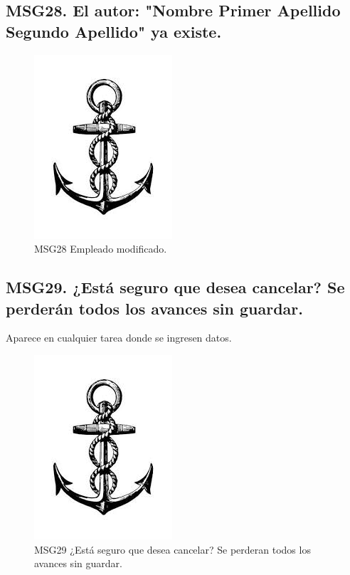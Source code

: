 \subsection{MSG28. El autor: "Nombre Primer Apellido Segundo Apellido" ya existe.}
    \begin{figure}[htbp]
        \begin{center}
            \includegraphics[width=.4\textwidth]{images/MSG/ancla}
            \caption{MSG28 Empleado modificado.}
            \label{fig:MSG28}
        \end{center}
    \end{figure}

    \subsection{MSG29. ¿Está seguro que desea cancelar? Se perderán todos los avances sin guardar.}
     Aparece en cualquier tarea donde se ingresen datos.
        \begin{figure}[htbp]
            \begin{center}
                \includegraphics[width=.4\textwidth]{images/MSG/ancla}
                \caption{MSG29 ¿Está seguro que desea cancelar? Se perderan todos los avances sin guardar.}
                \label{fig:MSG29}
            \end{center}
        \end{figure}

